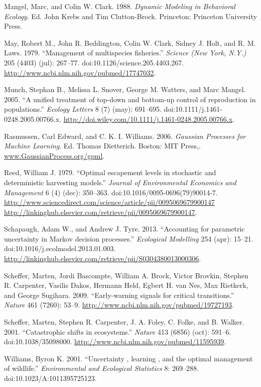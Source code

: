 \documentclass[author-year, review]{elsarticle} %
\begin{document}
Mangel, Marc, and Colin W. Clark. 1988. \emph{Dynamic Modeling in
Behavioral Ecology}. Ed. John Krebs and Tim Clutton-Brock. Princeton:
Princeton University Press.

May, Robert M., John R. Beddington, Colin W. Clark, Sidney J. Holt, and
R. M. Laws. 1979. ``Management of multispecies fisheries.''
\emph{Science (New York, N.Y.)} 205 (4403) (jul): 267--77.
doi:10.1126/science.205.4403.267.
\url{http://www.ncbi.nlm.nih.gov/pubmed/17747032}.

Munch, Stephan B., Melissa L. Snover, George M. Watters, and Marc
Mangel. 2005. ``A unified treatment of top-down and bottom-up control of
reproduction in populations.'' \emph{Ecology Letters} 8 (7) (may):
691--695. doi:10.1111/j.1461-0248.2005.00766.x.
\url{http://doi.wiley.com/10.1111/j.1461-0248.2005.00766.x}.

Rasmussen, Carl Edward, and C. K. I. Williams. 2006. \emph{Gaussian
Processes for Machine Learning}. Ed. Thomas Dietterich. Boston: MIT
Press,. \url{www.GaussianProcess.org/gpml}.

Reed, William J. 1979. ``Optimal escapement levels in stochastic and
deterministic harvesting models.'' \emph{Journal of Environmental
Economics and Management} 6 (4) (dec): 350--363.
doi:10.1016/0095-0696(79)90014-7.
\href{http://www.sciencedirect.com/science/article/pii/0095069679900147 http://linkinghub.elsevier.com/retrieve/pii/0095069679900147}{http://www.sciencedirect.com/science/article/pii/0095069679900147
http://linkinghub.elsevier.com/retrieve/pii/0095069679900147}.

Schapaugh, Adam W., and Andrew J. Tyre. 2013. ``Accounting for
parametric uncertainty in Markov decision processes.'' \emph{Ecological
Modelling} 254 (apr): 15--21. doi:10.1016/j.ecolmodel.2013.01.003.
\url{http://linkinghub.elsevier.com/retrieve/pii/S0304380013000306}.

Scheffer, Marten, Jordi Bascompte, William A. Brock, Victor Brovkin,
Stephen R. Carpenter, Vasilis Dakos, Hermann Held, Egbert H. van Nes,
Max Rietkerk, and George Sugihara. 2009. ``Early-warning signals for
critical transitions.'' \emph{Nature} 461 (7260): 53--9.
\url{http://www.ncbi.nlm.nih.gov/pubmed/19727193}.

Scheffer, Marten, Stephen R. Carpenter, J. A. Foley, C. Folke, and B.
Walker. 2001. ``Catastrophic shifts in ecosystems.'' \emph{Nature} 413
(6856) (oct): 591--6. doi:10.1038/35098000.
\url{http://www.ncbi.nlm.nih.gov/pubmed/11595939}.

Williams, Byron K. 2001. ``Uncertainty , learning , and the optimal
management of wildlife.'' \emph{Environmental and Ecological Statistics}
8: 269--288. doi:10.1023/A:1011395725123.
\end{document}
